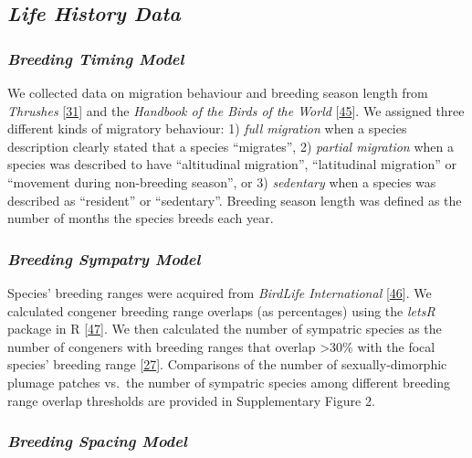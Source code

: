 \documentclass[
  a4paper,
]{article}
\begin{document}
\hypertarget{life-history-data}{%
\subsection{\texorpdfstring{\emph{Life History
Data}}{Life History Data}}\label{life-history-data}}

\hypertarget{breeding-timing-model}{%
\subsubsection{\texorpdfstring{\emph{Breeding Timing
Model}}{Breeding Timing Model}}\label{breeding-timing-model}}

We collected data on migration behaviour and breeding season length from
\emph{Thrushes} {[}\protect\hyperlink{ref-clement2000}{31}{]} and the
\emph{Handbook of the Birds of the World}
{[}\protect\hyperlink{ref-delhoyo2017}{45}{]}⁠. We assigned three
different kinds of migratory behaviour: 1) \emph{full migration} when a
species description clearly stated that a species ``migrates'', 2)
\emph{partial migration} when a species was described to have
``altitudinal migration'', ``latitudinal migration'' or ``movement
during non-breeding season'', or 3) \emph{sedentary} when a species was
described as ``resident'' or ``sedentary''. Breeding season length was
defined as the number of months the species breeds each year.

\hypertarget{breeding-sympatry-model}{%
\subsubsection{\texorpdfstring{\emph{Breeding Sympatry
Model}}{Breeding Sympatry Model}}\label{breeding-sympatry-model}}

Species' breeding ranges were acquired from \emph{BirdLife
International}
{[}\protect\hyperlink{ref-birdlifeinternationalandhandbookofthebirdsoftheworld2018}{46}{]}⁠.
We calculated congener breeding range overlaps (as percentages) using
the \emph{letsR} package in R
{[}\protect\hyperlink{ref-vilela2015}{47}{]}⁠. We then calculated the
number of sympatric species as the number of congeners with breeding
ranges that overlap \textgreater30\% with the focal species' breeding
range {[}\protect\hyperlink{ref-cooney2017}{27}{]}. Comparisons of the
number of sexually-dimorphic plumage patches vs.~the number of sympatric
species among different breeding range overlap thresholds are provided
in Supplementary Figure 2.

\hypertarget{breeding-spacing-model}{%
\subsubsection{\texorpdfstring{\emph{Breeding Spacing
Model}}{Breeding Spacing Model}}\label{breeding-spacing-model}}
\end{document}
